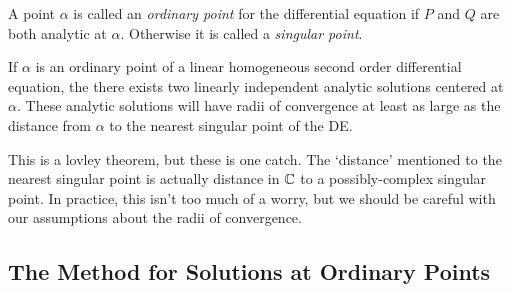 \documentclass[fleqn,letterpaper]{report}
\begin{document}
\begin{defn}
A point $\alpha$ is called an
\emph{ordinary point} for the differential equation if $P$ and
$Q$ are both analytic at $\alpha$. Otherwise it is called a
\emph{singular point}.
\end{defn}

\begin{thm}
\label{thm-series-solutions-existence}
If $\alpha$ is an ordinary point of a linear
homogeneous second order differential equation, the there
exists two linearly independent analytic solutions centered at
$\alpha$. These analytic solutions will have radii of
convergence at least as large as the distance from $\alpha$ to
the nearest singular point of the DE.
\end{thm}

This is a lovley theorem, but these is one catch. The
`distance' mentioned to the nearest singular point is actually
distance in $\mathbb{C}$ to a possibly-complex singular point. In
practice, this isn't too much of a worry, but we should be
careful with our assumptions about the radii of convergence. 

\subsection{The Method for Solutions at Ordinary Points}
\label{method-ordinary-points}
\end{document}
